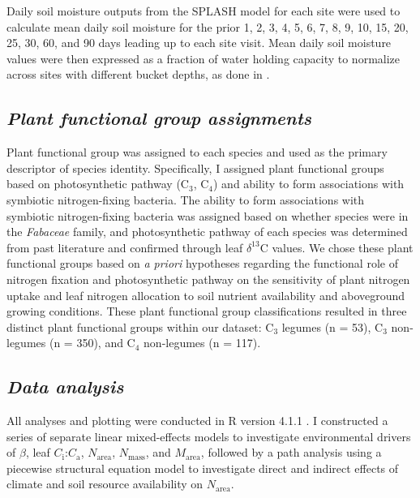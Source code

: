 Daily soil moisture outputs from the SPLASH model for each site were used to calculate mean daily soil moisture for the prior 1, 2, 3, 4, 5, 6, 7, 8, 9, 10, 15, 20, 25, 30, 60, and 90 days leading up to each site visit. Mean daily soil moisture values were then expressed as a fraction of water holding capacity to normalize across sites with different bucket depths, as done in .

\subsection{\textit{Plant functional group assignments}}
\noindent Plant functional group was assigned to each species and used as the primary descriptor of species identity. Specifically, I assigned plant functional groups based on photosynthetic pathway (C$_3$, C$_4$) and ability to form associations with symbiotic nitrogen-fixing bacteria. The ability to form associations with symbiotic nitrogen-fixing bacteria was assigned based on whether species were in the \textit{Fabaceae} family, and photosynthetic pathway of each species was determined from past literature and confirmed through leaf $\delta^{13}$C values. We chose these plant functional groups based on \textit{a priori} hypotheses regarding the functional role of nitrogen fixation and photosynthetic pathway on the sensitivity of plant nitrogen uptake and leaf nitrogen allocation to soil nutrient availability and aboveground growing conditions. These plant functional group classifications resulted in three distinct plant functional groups within our dataset: C$_3$ legumes (n = 53), C$_3$ non-legumes (n = 350), and C$_4$ non-legumes (n = 117).

\subsection{\textit{Data analysis}}
\noindent All analyses and plotting were conducted in R version 4.1.1 . I constructed a series of separate linear mixed-effects models to investigate environmental drivers of $\beta$, leaf $C_\mathrm{i}$:$C_\mathrm{a}$, $N_\mathrm{area}$, $N_\mathrm{mass}$, and $M_\mathrm{area}$, followed by a path analysis using a piecewise structural equation model to investigate direct and indirect effects of climate and soil resource availability on $N_\mathrm{area}$.

